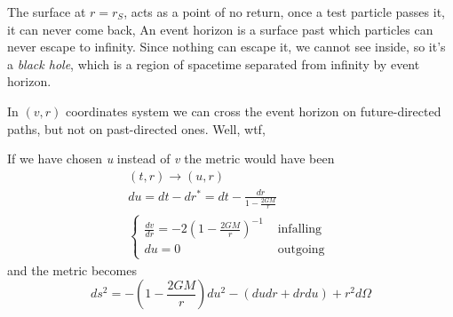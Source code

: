 \bigskip

The surface at $r=r_{S}$, acts as a point of no return, once a test particle passes it, it can never come back, An event horizon  is a surface past which particles can never escape to infinity. Since nothing can escape it, we cannot see inside, so it's a \emph{black hole}, which is a region of spacetime separated from infinity by event horizon.\par

In $\left( v,r \right)$ coordinates system we can cross the event horizon on future-directed paths, but not on past-directed ones. Well, wtf,\par
If we have chosen \emph{u} instead of \emph{v} the metric would have been
\begin{gather*}
	\left( t,r \right) \to \left( u,r \right) \\
	du = dt- dr^{*} = dt - \frac{dr}{1 - \frac{2GM}{r}} \\
	\begin{cases}
		\frac{d v}{d r} =-2 \left(  1 - \frac{2GM}{r} \right)^{-1} & \text{  infalling }\\
		du = 0 &\text{  outgoing }
	\end{cases}
\end{gather*}
and the metric becomes
\begin{equation}
ds^{2} = - \left( 1 - \frac{2GM}{r} \right)du^{2} - \left(  dudr + drdu \right) + r^{2}d\Omega 
\end{equation}

